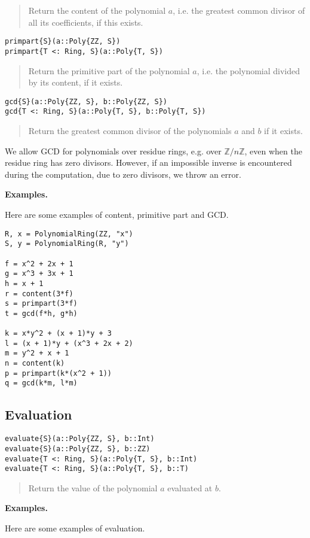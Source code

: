 \documentclass[a4paper,10pt]{article}
\newcommand{\Z}{\mathbb{Z}}
\newcommand{\desc}[1]{\vspace{-3mm}\begin{quote}#1\end{quote}}
\begin{document}
{{{{{{\desc{Return the content of the polynomial $a$, i.e. the greatest common divisor
of all its coefficients, if this exists.}

\begin{lstlisting}
primpart{S}(a::Poly{ZZ, S})
primpart{T <: Ring, S}(a::Poly{T, S})
\end{lstlisting}

\desc{Return the primitive part of the polynomial $a$, i.e. the polynomial
divided by its content, if it exists.}

\begin{lstlisting}
gcd{S}(a::Poly{ZZ, S}, b::Poly{ZZ, S})
gcd{T <: Ring, S}(a::Poly{T, S}, b::Poly{T, S})
\end{lstlisting}

\desc{Return the greatest common divisor of the polynomials $a$ and $b$ if 
it exists.}

We allow GCD for polynomials over residue rings, e.g. over $\Z/n\Z$, even when
the residue ring has zero divisors. However, if an impossible inverse is
encountered during the computation, due to zero divisors, we throw an error.

\textbf{Examples.}

Here are some examples of content, primitive part and GCD.

\begin{lstlisting}
R, x = PolynomialRing(ZZ, "x")
S, y = PolynomialRing(R, "y")

f = x^2 + 2x + 1
g = x^3 + 3x + 1
h = x + 1
r = content(3*f)
s = primpart(3*f)
t = gcd(f*h, g*h)

k = x*y^2 + (x + 1)*y + 3
l = (x + 1)*y + (x^3 + 2x + 2)
m = y^2 + x + 1
n = content(k)
p = primpart(k*(x^2 + 1))
q = gcd(k*m, l*m)
\end{lstlisting}

\subsection{Evaluation}

\begin{lstlisting}
evaluate{S}(a::Poly{ZZ, S}, b::Int)
evaluate{S}(a::Poly{ZZ, S}, b::ZZ)
evaluate{T <: Ring, S}(a::Poly{T, S}, b::Int)
evaluate{T <: Ring, S}(a::Poly{T, S}, b::T)
\end{lstlisting}

\desc{Return the value of the polynomial $a$ evaluated at $b$.}

\textbf{Examples.}

Here are some examples of evaluation.

}}}}}}
\end{document}
